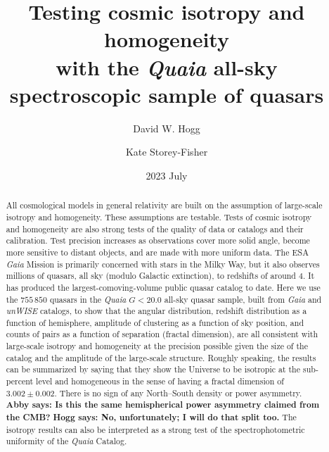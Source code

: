 \documentclass[modern]{aastex631}
\newcommand{\abby}[1]{\textbf{Abby says: #1}}
\newcommand{\hogg}[1]{\textbf{Hogg says: #1}}
\begin{document}
\title{\large%
Testing cosmic isotropy and homogeneity \\ with the \textsl{Quaia} all-sky spectroscopic sample of quasars}
\author[0000-0003-2866-9403]{David W. Hogg}

\author[0000-0001-8764-7103]{Kate Storey-Fisher}

\date{2023 July}

\begin{abstract}\noindent
All cosmological models in general relativity are built on the assumption of large-scale isotropy and homogeneity.
These assumptions are testable.
Tests of cosmic isotropy and homogeneity are also strong tests of the quality of data or catalogs and their calibration.
Test precision increases as observations cover more solid angle, become more sensitive to distant objects, and are made with more uniform data.
The ESA \textsl{Gaia} Mission is primarily concerned with stars in the Milky Way, but it also observes millions of quasars, all sky (modulo Galactic extinction), to redshifts of around $4$.
It has produced the largest-comoving-volume public quasar catalog to date.
Here we use the $755\,850$ quasars in the \textsl{Quaia} $G<20.0$ all-sky quasar sample, built from \textsl{Gaia} and \textsl{unWISE} catalogs, to show that the angular distribution, redshift distribution as a function of hemisphere, amplitude of clustering as a function of sky position, and counts of pairs as a function of separation (fractal dimension), are all consistent with large-scale isotropy and homogeneity at the precision possible given the size of the catalog and the amplitude of the large-scale structure.
Roughly speaking, the results can be summarized by saying that they show the Universe to be isotropic at the sub-percent level and homogeneous in the sense of having a fractal dimension of $3.002\pm 0.002$.
There is no sign of any North--South density or power asymmetry.
\abby{Is this the same hemispherical power asymmetry claimed from the CMB?}
\hogg{No, unfortunately; I will do that split too.}
The isotropy results can also be interpreted as a strong test of the spectrophotometric uniformity of the \textsl{Quaia} Catalog.
\end{abstract}

\end{document}
